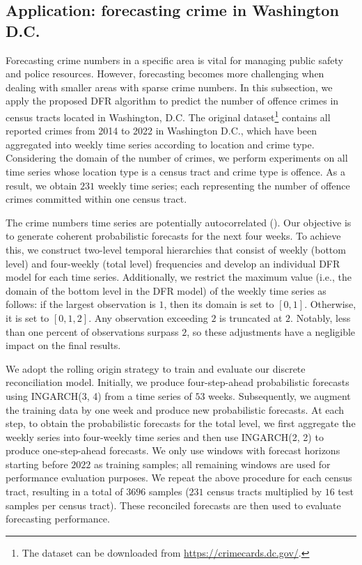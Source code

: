 \documentclass[a4paper,review,12pt,authoryear]{elsarticle}
\theoremstyle{definition}
\begin{document}
     \subsection{Application: forecasting crime in Washington D.C.}
     \label{sec:application_crime}

     Forecasting crime numbers in a specific area is vital for managing public safety and police resources.
     However, forecasting becomes more challenging when dealing with smaller areas with sparse crime numbers.
     In this subsection, we apply the proposed DFR algorithm to predict the number of offence crimes in census tracts located in Washington, D.C.
     The original dataset\footnote{The dataset can be downloaded from \url{https://crimecards.dc.gov/}.} contains all reported crimes from 2014 to 2022 in Washington D.C., which have been aggregated into weekly time series according to location and crime type.
     Considering the domain of the number of crimes, we perform experiments on all time series whose location type is a census tract and crime type is offence.
     As a result, we obtain $231$ weekly time series; each representing the number of offence crimes committed within one census tract.

     The crime numbers time series are potentially autocorrelated (\citealp{aldor-noimanSpatioTemporalLowCount2013}).
     Our objective is to generate coherent probabilistic forecasts for the next four weeks.
     To achieve this, we construct two-level temporal hierarchies that consist of weekly (bottom level) and four-weekly (total level) frequencies and develop an individual DFR model for each time series.
     Additionally, we restrict the maximum value (i.e., the domain of the bottom level in the DFR model) of the weekly time series as follows: if the largest observation is $1$, then its domain is set to $[0, 1]$.
     Otherwise, it is set to $[0, 1, 2]$.
     Any observation exceeding $2$ is truncated at $2$.
     Notably, less than one percent of observations surpass $2$, so these adjustments have a negligible impact on the final results.

     We adopt the rolling origin strategy to train and evaluate our discrete reconciliation model.
     Initially, we produce four-step-ahead probabilistic forecasts using INGARCH(3, 4) from a time series of $53$ weeks.
     Subsequently, we augment the training data by one week and produce new probabilistic forecasts.
     At each step, to obtain the probabilistic forecasts for the total level, we first aggregate the weekly series into four-weekly time series and then use INGARCH(2, 2) to produce one-step-ahead forecasts.
     We only use windows with forecast horizons starting before $2022$ as training samples; all remaining windows are used for performance evaluation purposes.
     We repeat the above procedure for each census tract, resulting in a total of $3696$ samples ($231$ census tracts multiplied by $16$ test samples per census tract).
     These reconciled forecasts are then used to evaluate forecasting performance.
\end{document}
